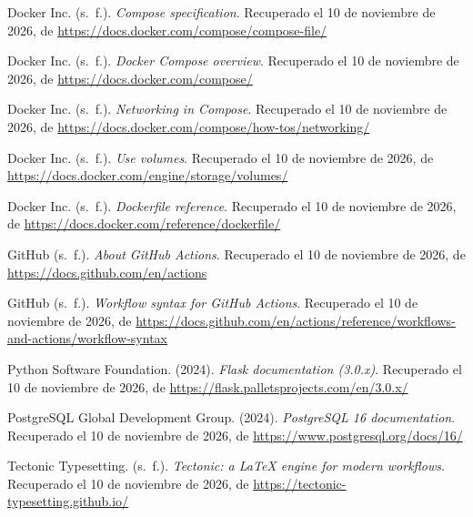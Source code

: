 \documentclass[12pt,a4paper]{article}
\begin{document}
\begin{list}{}{\setlength{\leftmargin}{1.5cm}\setlength{\itemsep}{0.5em}}
\item Docker Inc. (s.\ f.). \textit{Compose specification}. Recuperado el 10 de noviembre
      de 2026, de \url{https://docs.docker.com/compose/compose-file/}

\item Docker Inc. (s.\ f.). \textit{Docker Compose overview}. Recuperado el 10 de noviembre
      de 2026, de \url{https://docs.docker.com/compose/}

\item Docker Inc. (s.\ f.). \textit{Networking in Compose}. Recuperado el 10 de noviembre
      de 2026, de \url{https://docs.docker.com/compose/how-tos/networking/}

\item Docker Inc. (s.\ f.). \textit{Use volumes}. Recuperado el 10 de noviembre de 2026,
      de \url{https://docs.docker.com/engine/storage/volumes/}

\item Docker Inc. (s.\ f.). \textit{Dockerfile reference}. Recuperado el 10 de noviembre de
      2026, de \url{https://docs.docker.com/reference/dockerfile/}

\item GitHub (s.\ f.). \textit{About GitHub Actions}. Recuperado el 10 de noviembre de 2026,
      de \url{https://docs.github.com/en/actions}

\item GitHub (s.\ f.). \textit{Workflow syntax for GitHub Actions}. Recuperado el 10 de
      noviembre de 2026, de \url{https://docs.github.com/en/actions/reference/workflows-and-actions/workflow-syntax}

\item Python Software Foundation. (2024). \textit{Flask documentation (3.0.x)}.
      Recuperado el 10 de noviembre de 2026, de \url{https://flask.palletsprojects.com/en/3.0.x/}

\item PostgreSQL Global Development Group. (2024). \textit{PostgreSQL 16 documentation}.
      Recuperado el 10 de noviembre de 2026, de \url{https://www.postgresql.org/docs/16/}

\item Tectonic Typesetting. (s.\ f.). \textit{Tectonic: a LaTeX engine for modern
      workflows}. Recuperado el 10 de noviembre de 2026, de
      \url{https://tectonic-typesetting.github.io/}
\end{list}
\end{document}
